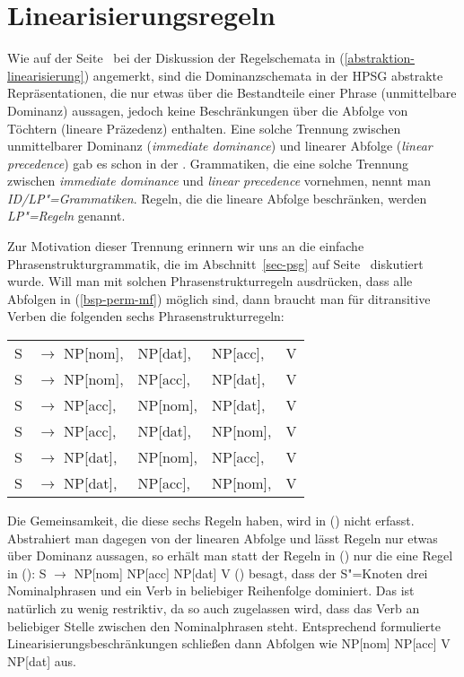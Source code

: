 \section{Linearisierungsregeln}

Wie auf der Seite~\pageref{abstraktion-linearisierung} bei der Diskussion der Regelschemata in
(\ref{abstraktion-linearisierung}) angemerkt, sind die Dominanzschemata in der HPSG abstrakte
Repräsentationen, die nur etwas über die Bestandteile einer Phrase (unmittelbare Dominanz)
aussagen, jedoch keine Beschränkungen über die Abfolge von Töchtern (lineare Präzedenz)
enthalten. Eine solche Trennung zwischen unmittelbarer Dominanz (\emph{immediate dominance})
und linearer Abfolge (\emph{linear precedence}) gab es schon in der \gpsg
\citep*{GKPS85a}. Grammatiken, die eine solche Trennung zwischen \emph{immediate dominance} und
\emph{linear precedence} vornehmen, nennt man \emph{ID/LP"=Grammatiken}. Regeln, die die lineare Abfolge
beschränken, werden \emph{LP"=Regeln} genannt.

Zur Motivation dieser Trennung erinnern wir uns an die einfache Phrasenstrukturgrammatik,
die im Abschnitt~\ref{sec-psg} auf Seite~\pageref{ditrans-ps-regeln} diskutiert wurde. Will man
mit solchen Phrasenstrukturregeln ausdrücken, dass alle Abfolgen in (\ref{bsp-perm-mf}) möglich sind,
dann braucht man für ditransitive Verben die folgenden sechs Phrasenstrukturregeln:
\ea
\begin{tabular}[t]{@{}l@{ }l@{ }l@{ }l@{ }l}
S  & $\to$ NP[nom],& NP[dat], & NP[acc], & V\\
S  & $\to$ NP[nom],& NP[acc], & NP[dat], & V\\
S  & $\to$ NP[acc],& NP[nom], & NP[dat], & V\\
S  & $\to$ NP[acc],& NP[dat], & NP[nom], & V\\
S  & $\to$ NP[dat],& NP[nom], & NP[acc], & V\\
S  & $\to$ NP[dat],& NP[acc], & NP[nom], & V\\
\end{tabular}
\z
Die Gemeinsamkeit, die diese sechs Regeln haben, wird in () nicht erfasst. Abstrahiert man
dagegen von der linearen Abfolge und lässt Regeln nur etwas über Dominanz aussagen, so erhält man
statt der Regeln in () nur die eine Regel in ():
 \ea
S $\to$ NP[nom] NP[acc] NP[dat] V
\z
() besagt, dass der S"=Knoten drei Nominalphrasen und ein Verb in beliebiger Reihenfolge
dominiert. Das ist natürlich zu wenig restriktiv, da so auch zugelassen wird, dass das Verb an beliebiger
Stelle zwischen den Nominalphrasen steht. Entsprechend formulierte Linearisierungsbeschränkungen
schließen dann Abfolgen wie NP[nom] NP[acc] V NP[dat] aus.

